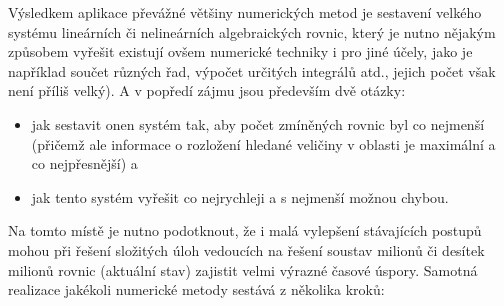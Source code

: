     Výsledkem aplikace převážné většiny numerických metod je sestavení velkého systému lineárních či
    nelineárních algebraických rovnic, který je nutno nějakým způsobem vyřešit existují ovšem
    numerické techniky i pro jiné účely, jako je například součet různých řad, výpočet určitých
    integrálů atd., jejich počet však není příliš velký). A v popředí zájmu jsou především dvě
    otázky:
    \begin{itemize}
      \item jak sestavit onen systém tak, aby počet zmíněných rovnic byl co nej\-men\-ší (přičemž 
            ale informace o rozložení hledané veličiny v oblasti je maximální a co nejpřesnější) a
      \item jak tento systém vyřešit co nejrychleji a s nejmenší možnou chybou.
    \end{itemize}
    Na tomto místě je nutno podotknout, že i malá vylepšení stávajících postupů mohou při řešení
    složitých úloh vedoucích na řešení soustav milionů či desítek milionů rovnic (aktuální stav)
    zajistit velmi výrazné časové úspory. Samotná realizace jakékoli numerické metody sestává z
    několika kroků:
